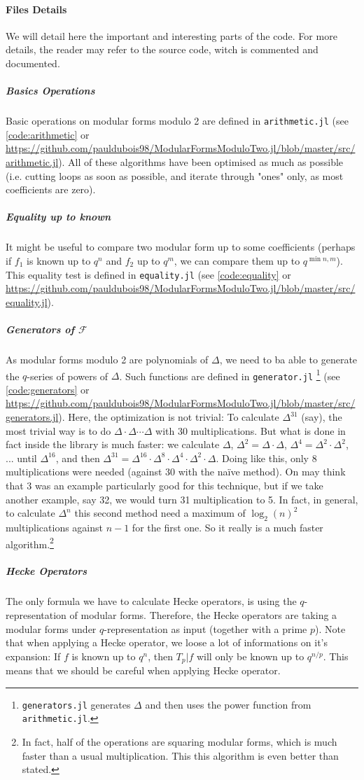 \paragraph{Files Details}
We will detail here the important and interesting parts of the code.
For more details, the reader may refer to the source code, witch is commented and documented.
\subparagraph{Basics Operations}
Basic operations on modular forms modulo 2 are defined in \texttt{arithmetic.jl} (see \ref{code:arithmetic} or \url{https://github.com/pauldubois98/ModularFormsModuloTwo.jl/blob/master/src/arithmetic.jl}).
All of these algorithms have been optimised as much as possible (i.e. cutting loops as soon as possible, and iterate through "ones" only, as most coefficients are zero).
\subparagraph{Equality up to known}
It might be useful to compare two modular form up to some coefficients (perhaps if $f_1$ is known up to $q^n$ and $f_2$ up to $q^m$, we can compare them up to $q^{\min{n,m}}$).
This equality test is defined in \texttt{equality.jl} (see \ref{code:equality} or \url{https://github.com/pauldubois98/ModularFormsModuloTwo.jl/blob/master/src/equality.jl}).
\subparagraph{Generators of $\mathcal{F}$}
As modular forms modulo 2 are polynomials of $\Delta$, we need to ba able to generate the $q$-series of powers of $\Delta$.
Such functions are defined in \texttt{generator.jl} \footnote{\texttt{generators.jl} generates $\Delta$ and then uses the power function from \texttt{arithmetic.jl}.} (see \ref{code:generators} or \url{https://github.com/pauldubois98/ModularFormsModuloTwo.jl/blob/master/src/generators.jl}).
Here, the optimization is not trivial:
To calculate $\Delta^{31}$ (say), the most trivial way is to do $\Delta \cdot \Delta \cdots \Delta$ with 30 multiplications.
But what is done in fact inside the library is much faster: we calculate $\Delta$, $\Delta^2 = \Delta \cdot \Delta$, $\Delta^4 = \Delta^2 \cdot \Delta^2$, ... until $\Delta^{16}$, and then $\Delta^{31} = \Delta^{16} \cdot \Delta^8 \cdot \Delta^4 \cdot \Delta^2 \cdot \Delta$.
Doing like this, only 8 multiplications were needed (against 30 with the naïve method).
On may think that 3 was an example particularly good for this technique, but if we take another example, say 32, we would turn 31 multiplication to 5.
In fact, in general, to calculate $\Delta^n$ this second method need a maximum of $\log_2(n)^2$ multiplications against $n-1$ for the first one.
So it really is a much faster algorithm.\footnote{In fact, half of the operations are squaring modular forms, which is much faster than a usual multiplication. This this algorithm is even better than stated.}
\subparagraph{Hecke Operators}
The only formula we have to calculate Hecke operators, is using the $q$-representation of modular forms.
Therefore, the Hecke operators are taking a modular forms under $q$-representation as input (together with a prime $p$).
Note that when applying a Hecke operator, we loose a lot of informations on it's expansion:
If $f$ is known up to $q^n$, then $T_p|f$ will only be known up to $q^{n/p}$.
This means that we should be careful when applying Hecke operator.

